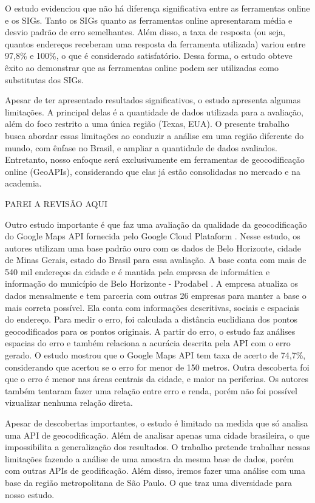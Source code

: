 O estudo evidenciou que não há diferença significativa entre as ferramentas online e os SIGs. Tanto os SIGs quanto as ferramentas online apresentaram média e desvio padrão de erro semelhantes. Além disso, a taxa de resposta (ou seja, quantos endereços receberam uma resposta da ferramenta utilizada) variou entre 97,8\% e 100\%, o que é considerado satisfatório. Dessa forma, o estudo obteve êxito ao demonstrar que as ferramentas online podem ser utilizadas como substitutas dos SIGs.

Apesar de \cite{Chow2016} ter apresentado resultados significativos, o estudo apresenta algumas limitações. A principal delas é a quantidade de dados utilizada para a avaliação, além do foco restrito a uma única região (Texas, EUA). O presente trabalho busca abordar essas limitações ao conduzir a análise em uma região diferente do mundo, com ênfase no Brasil, e ampliar a quantidade de dados avaliados. Entretanto, nosso enfoque será exclusivamente em ferramentas de geocodificação online (GeoAPIs), considerando que elas já estão consolidadas no mercado e na academia.

PAREI A REVISÃO AQUI

Outro estudo importante é \cite{Clodoveu2011} que faz uma avaliação da qualidade da geocodificação do Google Maps API fornecida pelo Google Cloud Plataform \cite{GCP}. Nesse estudo, os autores utilizam uma base padrão ouro com os dados de Belo Horizonte, cidade de Minas Gerais, estado do Brasil para essa avaliação. A base conta com mais de 540 mil endereços da cidade e é mantida pela empresa de informática e informação do município de Belo Horizonte - Prodabel \cite{Prodabel}. A empresa atualiza os dados mensalmente
e tem parceria com outras 26 empresas para manter a base o mais correta possível. Ela conta com informações descritivas, sociais e espaciais do endereço. Para medir o erro, foi calculada a distância euclidiana dos pontos geocodificados para os pontos originais. A partir do erro, o estudo faz análises espacias do erro e também relaciona a acurácia descrita pela API com o erro gerado. O estudo mostrou que o Google Maps API tem taxa de acerto de 74,7\%, considerando que acertou se o erro for menor de 150 metros. Outra descoberta foi que o erro é menor nas áreas centrais da cidade, e maior na periferias. Os autores também tentaram fazer uma relação entre erro e renda, porém não foi possível vizualizar nenhuma relação direta. 

Apesar de descobertas importantes, o estudo é limitado na medida que só analisa uma API de geocodificação. Além de analisar apenas uma cidade brasileira, o que impossibilita a generalização dos resultados. O trabalho pretende trabalhar nessas limitações fazendo a análise de uma amostra da mesma base de dados, porém com outras APIs de geodificação. Além disso, iremos fazer uma análise com uma base da região metropolitana de São Paulo. O que traz uma diversidade para nosso estudo. 

